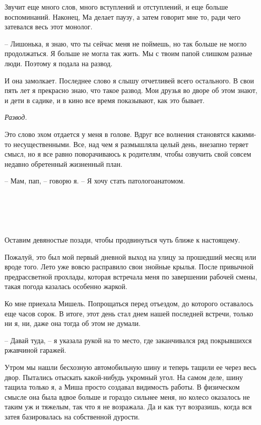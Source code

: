 \documentclass[
]{book}
\begin{document}
Звучит еще много слов, много вступлений и отступлений, и еще больше воспоминаний. Наконец, Ма делает паузу, а затем говорит мне то, ради чего затевался весь этот монолог.

-- Лишонька, я знаю, что ты сейчас меня не поймешь, но так больше не могло продолжаться. Я больше не могла так жить. Мы с твоим папой слишком разные люди. Поэтому я подала на развод.

И она замолкает. Последнее слово я слышу отчетливей всего остального. В свои пять лет я прекрасно знаю, что такое развод. Мои друзья во дворе об этом знают, и дети в садике, и в кино все время показывают, как это бывает.

\emph{Развод. }

Это слово эхом отдается у меня в голове. Вдруг все волнения становятся какими-то несущественными. Все, над чем я размышляла целый день, внезапно теряет смысл, но я все равно поворачиваюсь к родителям, чтобы озвучить свой совсем недавно обретенный жизненный план.

-- Мам, пап, -- говорю я. -- Я хочу стать патологоанатомом.

\hypertarget{chapter-46}{%
\chapter{~}\label{chapter-46}}

Оставим девяностые позади, чтобы продвинуться чуть ближе к настоящему.

Пожалуй, это был мой первый дневной выход на улицу за прошедший месяц или вроде того. Лето уже вовсю расправило свои знойные крылья. После привычной предрассветной прохлады, которая встречала меня по завершении рабочей смены, такая погода казалась особенно жаркой.

Ко мне приехала Мишель. Попрощаться перед отъездом, до которого оставалось еще часов сорок. В итоге, этот день стал днем нашей последней встречи, только ни я, ни, даже она тогда об этом не думали.

-- Давай туда, -- я указала рукой на то место, где заканчивался ряд покрывшихся ржавчиной гаражей.

Утром мы нашли бесхозную автомобильную шину и теперь тащили ее через весь двор. Пытались отыскать какой-нибудь укромный угол. На самом деле, шину тащила только я, а Миша просто создавал видимость работы. В физическом смысле она была вдвое больше и гораздо сильнее меня, но колесо оказалось не таким уж и тяжелым, так что я не возражала. Да и как тут возразишь, когда вся затея базировалась на собственной дурости.
\end{document}
